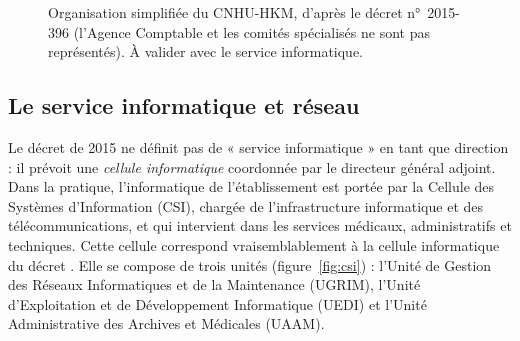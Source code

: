 \begin{figure}[htbp]
\centering
\small
{}
\caption{Organisation simplifiée du CNHU-HKM, d'après le décret n°~2015-396 (l'Agence Comptable et les comités spécialisés ne sont pas représentés). À valider avec le service informatique.}
\label{fig:organigramme}
\end{figure}

\subsection{Le service informatique et réseau}

Le décret de 2015 ne définit pas de « service informatique » en tant que direction : il prévoit une \emph{cellule informatique} coordonnée par le directeur général adjoint\cite{decret2015}. Dans la pratique, l'informatique de l'établissement est portée par la Cellule des Systèmes d'Information (CSI), chargée de l'infrastructure informatique et des télécommunications, et qui intervient dans les services médicaux, administratifs et techniques\cite{kaho2026}. Cette cellule correspond vraisemblablement à la cellule informatique du décret . Elle se compose de trois unités (figure~\ref{fig:csi}) : l'Unité de Gestion des Réseaux Informatiques et de la Maintenance (UGRIM), l'Unité d'Exploitation et de Développement Informatique (UEDI) et l'Unité Administrative des Archives et Médicales (UAAM)\cite{kaho2026}.

